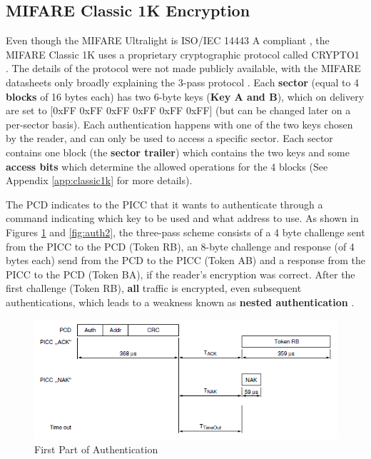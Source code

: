 \documentclass[fleqn,10pt]{SelfArx} %
\begin{document}
\subsection{MIFARE Classic 1K Encryption}
\label{subsec:crypto1}

Even though the MIFARE Ultralight is ISO/IEC 14443 A compliant \cite{ultralight}, the MIFARE Classic 1K uses a proprietary cryptographic protocol called CRYPTO1 \cite{classic1k}. The details of the protocol were not made publicly available, with the MIFARE datasheets only broadly explaining the 3-pass protocol \cite{classic1k}. Each {\bf sector} (equal to 4 {\bf blocks} of 16 bytes each) has two 6-byte keys ({\bf Key A and B}), which on delivery are set to [0xFF 0xFF 0xFF 0xFF 0xFF 0xFF] (but can be changed later on a per-sector basis). Each authentication happens with one of the two keys chosen by the reader, and can only be used to access a specific sector. Each sector contains one block (the {\bf sector trailer}) which contains the two keys and some {\bf access bits} which determine the allowed operations for the 4 blocks (See Appendix \ref{app:classic1k} for more details).


The PCD indicates to the PICC that it wants to authenticate through a command indicating which key to be used and what address to use. As shown in Figures \ref{fig:auth1} and \ref{fig:auth2}, the three-pass scheme consists of a 4 byte challenge sent from the PICC to the PCD  (Token RB), an 8-byte challenge and response (of 4 bytes each) send from the PCD to the PICC (Token AB) and a response from the PICC to the PCD (Token BA), if the reader's encryption was correct. After the first challenge (Token RB), {\bf all} traffic is encrypted, even subsequent authentications, which leads to a weakness known as {\bf nested authentication} \cite{classicvulnerabilities}.

\begin{figure}[h]
  \includegraphics[width=\linewidth]{img/auth1.png}
  \caption{First Part of Authentication \cite{classic1k}}
  \label{fig:auth1}
\end{figure}
\end{document}
